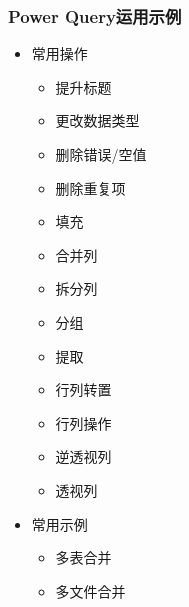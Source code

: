 \begin{frame}[fragile]
	\frametitle{Power Query运用示例}
	\begin{itemize}
		\item<+-> 常用操作
		\begin{itemize}
			\item 提升标题
			\item 更改数据类型
			\item 删除错误/空值
			\item 删除重复项
			\item 填充
			\item 合并列
			\item 拆分列
			\item 分组
			\item 提取
			\item 行列转置
			\item 行列操作
			\item 逆透视列
			\item 透视列
		\end{itemize}
		\item<+-> 常用示例
		\begin{itemize}		
			\item 多表合并
			\item 多文件合并		
		\end{itemize}
	\end{itemize}
\end{frame}
%
%
%
%
